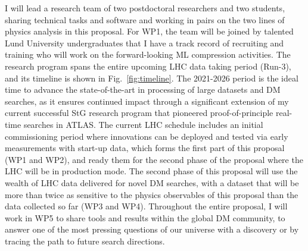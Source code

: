 \documentclass[11pt,a4paper]{article}
\begin{document}
I will lead a research team of two postdoctoral researchers and two students, sharing technical tasks and software and working in pairs on the two lines of physics analysis in this proposal.  
For WP1, the team will be joined by talented Lund University undergraduates that I have a track record of recruiting and training who will work on the forward-looking ML compression activities.
The research program spans the entire upcoming LHC data taking period (Run-3), and its timeline is shown in Fig.~\ref{fig:timeline}. 
The 2021-2026 period is the ideal time to advance the state-of-the-art in processing of large datasets and DM searches, as it ensures continued impact through a significant extension of my current successful StG research program that pioneered proof-of-principle real-time searches in ATLAS. 
The current LHC schedule includes an initial commissioning period where innovations can be deployed and tested via early measurements with start-up data, which forms the first part of this proposal (WP1 and WP2), and ready them for the second phase of the proposal where the LHC will be in production mode.   
The second phase of this proposal will use the wealth of LHC data delivered for novel DM searches, with a dataset that will be more than \color{red}twice \color{black} as sensitive to the physics observables of this proposal than the data collected so far (WP3 and WP4). 
Throughout the entire proposal, I will work in WP5 to share tools and results within the global DM community, to answer one of the most pressing questions of our universe with a discovery or by tracing the path to future search directions. 



\clearpage



\end{document}
